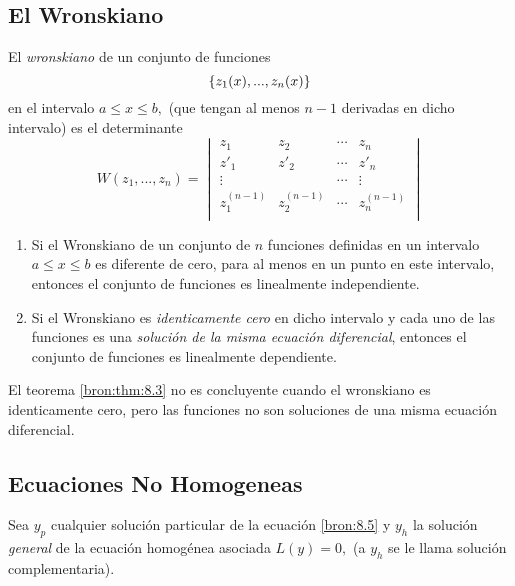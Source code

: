 \subsection{El Wronskiano}


	El \emph{wronskiano} de un conjunto de funciones
	$$
	\left\{ z_{1}(x),...,z_{n}(x) \right\}
	$$en el intervalo $a\leq x \leq b,$ (que tengan al menos $n-1$ derivadas en dicho intervalo) es el determinante
	$$
	W(z_{1},...,z_{n})=
	\begin{vmatrix}
		z_{1} & z_{2} & \cdots & z_{n} \\
		z'_{1} & z'_{2} & \cdots & z'_{n} \\
		\vdots & & \cdots & \vdots \\
		z^{(n-1)}_{1} & z^{(n-1)}_{2} & \cdots & z^{(n-1)}_{n} \\
	\end{vmatrix}
	$$



	\begin{thm}
		\label{bron:thm:8.3}
		\begin{enumerate}
			\item   Si el Wronskiano de un conjunto de $n$ funciones definidas en un intervalo $a \leq x \leq b$ es diferente de cero, para al menos en un punto en este intervalo, entonces el conjunto de funciones es linealmente independiente.			
			\item
			Si el Wronskiano es \emph{identicamente cero} en dicho intervalo y cada uno de las funciones es una \emph{soluci\'on de la misma ecuaci\'on diferencial}, entonces el conjunto de funciones es linealmente dependiente.
		\end{enumerate}
	\end{thm}
	



	\begin{rem}
		El teorema \ref{bron:thm:8.3} no es concluyente cuando el wronskiano es identicamente cero, pero las funciones no son soluciones de una misma ecuaci\'on diferencial.
	\end{rem}
	


\subsection{Ecuaciones No Homogeneas}


	Sea $y_{p}$ cualquier soluci\'on particular de la ecuaci\'on \eqref{bron:8.5} y $y_{h}$ la soluci\'on \emph{general} de la ecuaci\'on homog\'enea asociada $L(y)=0,$ (a $y_{h}$ se le llama soluci\'on complementaria).


